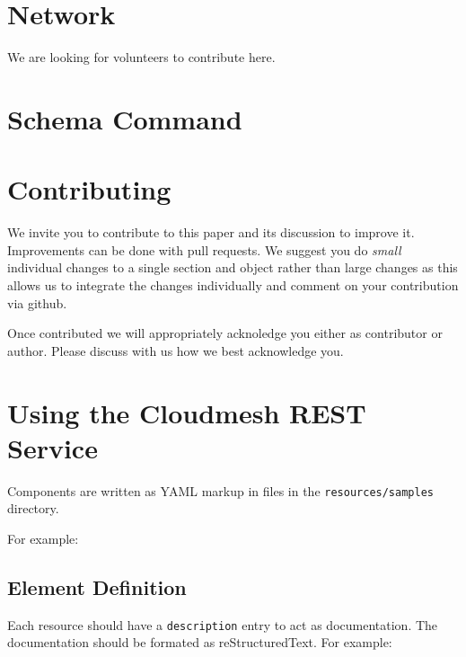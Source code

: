 \documentclass[9pt,twocolumn,twoside]{styles/osajnl}
\begin{document}

\section{Network}

We are looking for volunteers to contribute here.

\newpage

\appendix

\section{Schema Command}



\section{Contributing}

We invite you to contribute to this paper and its discussion to
improve it. Improvements can be done with pull requests. We suggest
you do {\em small} individual changes to a single section and object
rather than large changes as this allows us to integrate the changes
individually and comment on your contribution via github.

Once contributed we will appropriately acknoledge you either as
contributor or author. Please discuss with us how we best acknowledge
you.

\section{Using the Cloudmesh REST Service} 

Components are written as YAML markup in files in the
\verb+resources/samples+ directory.

For example:

\subsection{Element Definition}

Each resource should have a \verb+description+ entry to act as
documentation. The documentation should be formated as
reStructuredText. For example:
\end{document}
